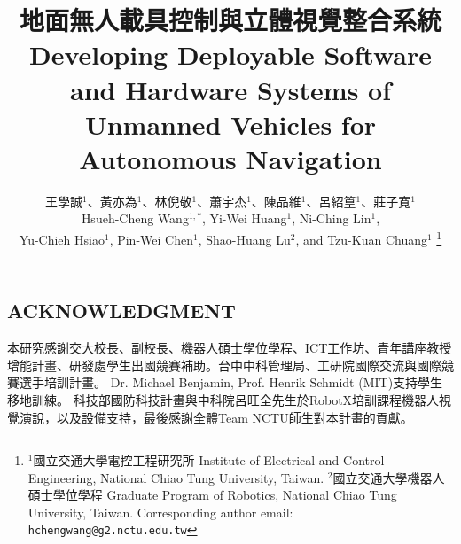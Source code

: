 \documentclass[letterpaper, 10 pt, conference]{ieeeconf}
\title{\LARGE \bf
地面無人載具控制與立體視覺整合系統 \\
Developing Deployable Software and Hardware Systems of Unmanned Vehicles for Autonomous Navigation}
\author{王學誠$^{1}$、黃亦為$^{1}$、林倪敬$^{1}$、蕭宇杰$^{1}$、陳品維$^{1}$、呂紹篁$^{1}$、莊子寬$^{1}$\\
Hsueh-Cheng Wang$^{1, *}$, Yi-Wei Huang$^{1}$, Ni-Ching Lin$^{1}$,\\
Yu-Chieh Hsiao$^{1}$, Pin-Wei Chen$^{1}$, 
Shao-Huang Lu$^{2}$, and Tzu-Kuan Chuang$^{1}$
\thanks{$^{1}$國立交通大學電控工程研究所 Institute of Electrical and Control Engineering, National Chiao Tung University, Taiwan. $^{2}$國立交通大學機器人碩士學位學程 Graduate Program of Robotics, National Chiao Tung University, Taiwan. Corresponding author email:
        {\tt\small hchengwang@g2.nctu.edu.tw}}%
}
\begin{document}
\begin{CJK}{UTF8}{bkai}

\maketitle

\thispagestyle{empty}
\pagestyle{empty}

















\section*{ACKNOWLEDGMENT}

本研究感謝交大校長、副校長、機器人碩士學位學程、ICT工作坊、青年講座教授增能計畫、研發處學生出國競賽補助。台中中科管理局、工研院國際交流與國際競賽選手培訓計畫。
Dr. Michael Benjamin, Prof. Henrik Schmidt (MIT)支持學生移地訓練。
科技部國防科技計畫與中科院呂旺全先生於RobotX培訓課程機器人視覺演說，以及設備支持，最後感謝全體Team NCTU師生對本計畫的貢獻。






\end{CJK}
\end{document}
